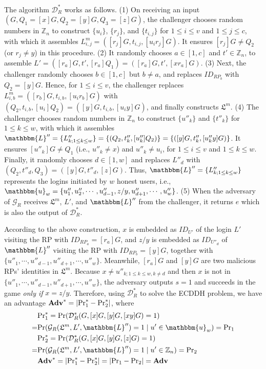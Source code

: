 The algorithm $\mathcal{D}^*_R$ works as follows. (1) On receiving an input $(G, Q_1=[x]G, Q_2=[y]G, Q_3=[z]G)$,
the challenger
chooses random numbers in $\mathbb{Z}_n$ to construct $\{u_i\}$, $\{r_j\}$, and $\{t_{i, j}\}$ for $1 \le i \le v$ and $1 \le j \le c$, with which it assembles $L^m_{i, j}=([r_j]G, t_{i,j}, [u_ir_j]G)$.
It ensures $[r_{j}]G \neq Q_2$ (or $r_j \neq y$) in this procedure.
(2) It randomly chooses $a \in [1, c]$ and $t' \in \mathbb{Z}_n$, to assemble $L' = ([r_{a}]G, t', [r_{a}]Q_1) = ([r_{a}]G, t', [xr_{a}]G)$.
(3)
Next, the challenger randomly chooses $b \in [1, c]$ but $b \neq a$, and replaces $ID_{RP_b}$ with $Q_2 = [y]G$.
Hence, for $1 \le i \le v$, the challenger replaces $L^m_{i, b}=([r_b]G, t_{i,b}, [u_ir_b]G)$ with $(Q_2, t_{i,b}, [u_i]Q_2) = ([y]G, t_{i,b}, [u_iy]G)$, and finally constructs $\mathfrak{L}^m$.
(4) The challenger chooses random numbers in $\mathbb{Z}_n$ to construct $\{u''_k\}$ and $\{t''_k\}$ for $1 \leq k \leq w$,
 with which it assembles $\mathbbm{L}'' = \{L''_{k; 1\leq k \leq w}\} = \{(Q_2, t''_k, [u''_k]Q_2)\} = \{([y]G, t''_k, [u''_ky]G)\}$.
It ensures $[u''_k]G \neq Q_1$ (i.e., $u''_k \neq x$) and $u''_k \neq u_i$,
 for $1 \le i \le v$ and $1 \le k \le w$.
Finally, it randomly chooses $d \in [1, w]$ and replaces $L''_{d}$ with $(Q_2, t''_d, Q_3) = ([y]G, t''_d, [z]G)$.
 Thus, $\mathbbm{L}'' = \{L''_{k;1\leq k \leq w}\}$ represents the logins initiated by $w$ honest users, i.e., $\mathbbm{u}_w=\{u''_1, u''_2, \cdots, u''_{d-1}, z/y, u''_{d+1}, \cdots, u''_w\}$.
 (5) When the adversary of $\mathcal{G}_R$ receives $\mathfrak{L}^m$, $L'$, and $\mathbbm{L}''$ from the challenger, it returns $e$ which is also the output of $\mathcal{D}^*_R$.

According to the above construction, %
$x$ is embedded as $ID_{U'}$ of the login $L'$ visiting the RP with $ID_{RP_{a}} = [r_{a}]G$,
and $z/y$ is embedded as $ID_{U''_d}$ of $\mathbbm{L}''$ visiting the RP with $ID_{RP_{b}}=[y]G$,
together with $\{u''_1, \cdots, u''_{d-1}, u''_{d+1}, \cdots, u''_w\}$.
Meanwhile, $[r_{a}]G$ and $[y]G$ are two malicious RPs' identities in $\mathfrak{L}^m$.
Because $x \neq u''_{k; 1\leq k \leq w, k \neq d}$ and then $x$ is not in $\{u''_1, \cdots, u''_{d-1}, u''_{d+1}, \cdots, u''_w\}$, the adversary outputs $s=1$ and succeeds in the game \emph{only if} $x = z/y$.
Therefore, using $\mathcal{D}^*_R$ to solve the ECDDH problem, we have an advantage $\mathbf{Adv}^*=|{\rm Pr}^*_1 - {\rm Pr}^*_2|$, where
\begin{align*}
&{\rm Pr}^*_1 =  {\rm Pr}(\mathcal{D}^*_R(G, [x]G, [y]G, [xy]G)=1) \\
=&{\rm Pr}(\mathcal{G}_R(\mathfrak{L}^m, L', \mathbbm{L}'')=1 \; | \; u' \in \mathbbm{u}_w) = {\rm Pr}_1 \\
&{\rm Pr}^*_2= {\rm Pr}(\mathcal{D}^*_R(G, [x]G, [y]G, [z]G)=1) \\
=&{\rm Pr}(\mathcal{G}_R(\mathfrak{L}^m, L', \mathbbm{L}'')=1 \; | \; u' \in \mathbb{Z}_n) = {\rm Pr}_2 \\
&\mathbf{Adv}^*=|{\rm Pr}^*_1-{\rm Pr}^*_2|=|{\rm Pr}_1-{\rm Pr}_2|={\mathbf{Adv}}
\end{align*}

